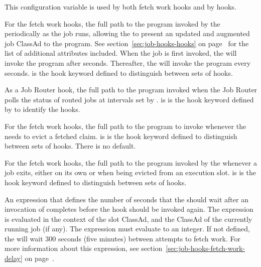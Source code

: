 \begin{description}
\label{param:HookUpdateJobInfo}
\item[\Macro{<Keyword>\_HOOK\_UPDATE\_JOB\_INFO}]
  This configuration variable is used by both fetch work hooks and
  by  hooks.

  For the fetch work hooks,
  the full path to the program invoked by the  periodically
  as the job runs, allowing the  to present an updated
  and augmented job ClassAd to the program.
  See section~\ref{sec:job-hooks-hooks} on page~\pageref{sec:job-hooks-hooks}
  for the list of additional attributes included.
  When the job is first invoked, the  will invoke the program
  after  seconds.
  Thereafter, the  will invoke the program every 
   seconds.
   is the hook keyword defined to distinguish
  between sets of hooks.

  As a Job Router hook,
  the full path to the program invoked when the Job Router polls the status
  of routed jobs at intervals set by .
   is is the hook keyword defined by
   to identify the hooks.

\label{param:HookEvictClaim}
\item[\Macro{<Keyword>\_HOOK\_EVICT\_CLAIM}]
  For the fetch work hooks,
  the full path to the program to invoke whenever the 
  needs to evict a fetched claim.
   is is the hook keyword defined to distinguish
  between sets of hooks.
  There is no default.

\label{param:HookJobExit}
\item[\Macro{<Keyword>\_HOOK\_JOB\_EXIT}]
  For the fetch work hooks,
  the full path to the program invoked by the 
  whenever a job exits,
  either on its own or when being evicted from an execution slot. 
   is is the hook keyword defined to distinguish
  between sets of hooks.

\label{param:FetchWorkDelay}
\item[\Macro{FetchWorkDelay}]
  An expression that defines the number of seconds that the
   should wait after an invocation of
   completes before the hook should be
  invoked again.
  The expression is evaluated in the context of the slot ClassAd, and
  the ClassAd of the currently running job (if any).
  The expression must evaluate to an integer.
  If not defined, the  will wait 300 seconds (five
  minutes) between attempts to fetch work.
  For more information about this expression, see
  section~\ref{sec:job-hooks-fetch-work-delay} on
  page~\pageref{sec:job-hooks-fetch-work-delay}.


\end{description}
